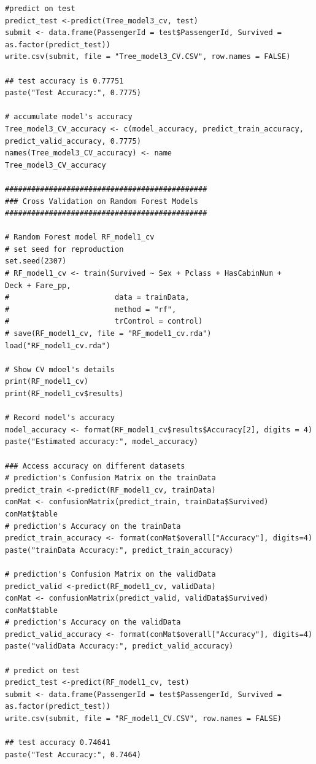 \documentclass[
]{book}
\begin{document}
\begin{verbatim}
#predict on test
predict_test <-predict(Tree_model3_cv, test)
submit <- data.frame(PassengerId = test$PassengerId, Survived = as.factor(predict_test))
write.csv(submit, file = "Tree_model3_CV.CSV", row.names = FALSE)

## test accuracy is 0.77751
paste("Test Accuracy:", 0.7775)

# accumulate model's accuracy
Tree_model3_CV_accuracy <- c(model_accuracy, predict_train_accuracy, predict_valid_accuracy, 0.7775)
names(Tree_model3_CV_accuracy) <- name
Tree_model3_CV_accuracy

##############################################
### Cross Validation on Random Forest Models
##############################################

# Random Forest model RF_model1_cv
# set seed for reproduction
set.seed(2307)
# RF_model1_cv <- train(Survived ~ Sex + Pclass + HasCabinNum +      Deck + Fare_pp,
#                        data = trainData,
#                        method = "rf",
#                        trControl = control)
# save(RF_model1_cv, file = "RF_model1_cv.rda")
load("RF_model1_cv.rda")

# Show CV mdoel's details
print(RF_model1_cv)
print(RF_model1_cv$results)

# Record model's accuracy
model_accuracy <- format(RF_model1_cv$results$Accuracy[2], digits = 4)
paste("Estimated accuracy:", model_accuracy)

### Access accuracy on different datasets
# prediction's Confusion Matrix on the trainData
predict_train <-predict(RF_model1_cv, trainData)
conMat <- confusionMatrix(predict_train, trainData$Survived)
conMat$table
# prediction's Accuracy on the trainData
predict_train_accuracy <- format(conMat$overall["Accuracy"], digits=4)
paste("trainData Accuracy:", predict_train_accuracy)

# prediction's Confusion Matrix on the validData
predict_valid <-predict(RF_model1_cv, validData)
conMat <- confusionMatrix(predict_valid, validData$Survived)
conMat$table
# prediction's Accuracy on the validData
predict_valid_accuracy <- format(conMat$overall["Accuracy"], digits=4)
paste("validData Accuracy:", predict_valid_accuracy)

# predict on test
predict_test <-predict(RF_model1_cv, test)
submit <- data.frame(PassengerId = test$PassengerId, Survived = as.factor(predict_test))
write.csv(submit, file = "RF_model1_CV.CSV", row.names = FALSE)

## test accuracy 0.74641
paste("Test Accuracy:", 0.7464)


\end{verbatim}
\end{document}
